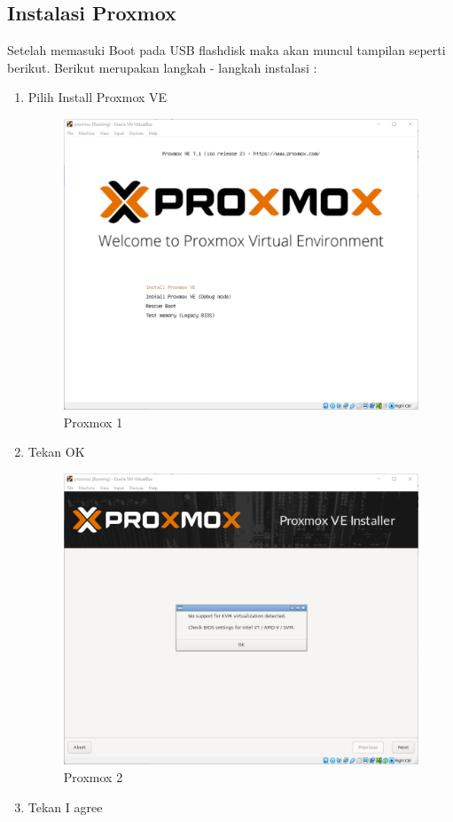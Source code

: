 \documentclass{article}
\begin{document}
  \subsection{Instalasi Proxmox}
  Setelah memasuki Boot pada USB flashdisk maka akan muncul tampilan seperti berikut. Berikut merupakan langkah - langkah instalasi :
  \begin{enumerate}
    \item Pilih Install Proxmox VE
    \begin{figure}[h!]
      \centering
      \includegraphics[width=0.7\linewidth]{proxmox 1.png}
      \caption{Proxmox 1}
    \end{figure}
    \newpage
    \item Tekan OK
    \begin{figure}[h!]
      \centering
      \includegraphics[width=0.7\linewidth]{proxmox 2.png}
      \caption{Proxmox 2}
    \end{figure}
    \item Tekan I agree
    \begin{figure}[h!]
      \centering

\end{figure}
\end{enumerate}
\end{document}
